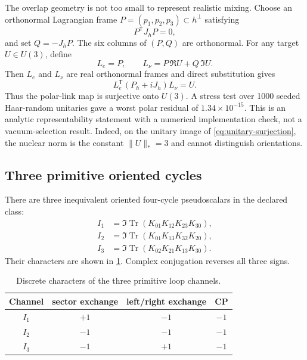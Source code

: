 \documentclass[11pt]{article}
\newcommand{\Tr}{\operatorname{Tr}}
\begin{document}
The overlap geometry is not too small to represent realistic mixing.  Choose an orthonormal Lagrangian frame $P=(p_1,p_2,p_3)\subset h^\perp$ satisfying
\begin{equation}
 P^{\mathsf T}J_hP=0,
\end{equation}
and set $Q=-J_hP$.  The six columns of $(P,Q)$ are orthonormal.  For any target $U\in U(3)$, define
\begin{equation}
 L_e=P,\qquad L_\nu=P\,\Re U+Q\,\Im U.
 \label{eq:unitary-reachability}
\end{equation}
Then $L_e$ and $L_\nu$ are real orthonormal frames and direct substitution gives
\begin{equation}
 L_e^{\mathsf T}(P_h+iJ_h)L_\nu=U.
 \label{eq:unitary-surjection}
\end{equation}
Thus the polar-link map is surjective onto $U(3)$.  A stress test over 1000 seeded Haar-random unitaries gave a worst polar residual of $1.34\times10^{-15}$.  This is an analytic representability statement with a numerical implementation check, not a vacuum-selection result.  Indeed, on the unitary image of \cref{eq:unitary-surjection}, the nuclear norm is the constant $\|U\|_*=3$ and cannot distinguish orientations.

\subsection{Three primitive oriented cycles}

There are three inequivalent oriented four-cycle pseudoscalars in the declared class:
\begin{align}
 I_1&=\Im\Tr(K_{01}K_{12}K_{23}K_{30}),\nonumber\\
 I_2&=\Im\Tr(K_{01}K_{13}K_{32}K_{20}),\nonumber\\
 I_3&=\Im\Tr(K_{02}K_{21}K_{13}K_{30}).
 \label{eq:loops}
\end{align}
Their characters are shown in \cref{tab:loop-characters}.  Complex conjugation reverses all three signs.

\begin{table}[t]
\centering
\caption{Discrete characters of the three primitive loop channels.}
\label{tab:loop-characters}
\begin{tabular}{@{}cccc@{}}
\toprule
Channel & sector exchange & left/right exchange & CP \\
\midrule
$I_1$ & $+1$ & $-1$ & $-1$ \\
$I_2$ & $-1$ & $-1$ & $-1$ \\
$I_3$ & $-1$ & $+1$ & $-1$ \\
\bottomrule
\end{tabular}
\end{table}
\end{document}
